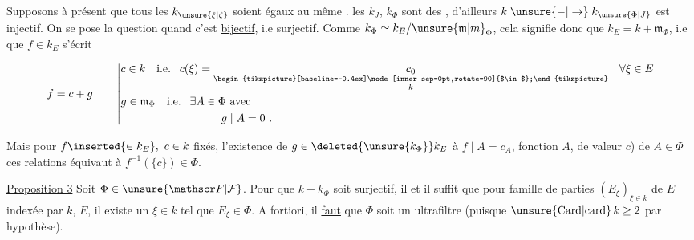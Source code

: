 

Supposons à présent que tous les $k_{\unsure{\xi|\zeta}}$ soient égaux au même .    les $k_J$, $k_\Phi$ sont des , d'ailleurs $k\mathrel{\unsure{-|\to}}k_{\unsure{\Phi|J}}$  est injectif. On se pose la question quand  c'est \uline{bijectif}, i.e surjectif. Comme $k_\Phi\simeq k_E/\unsure{\mathfrak m|m}_\Phi$, cela signifie donc que $k_E=k+\mathfrak m_\Phi$, i.e que  $f\in k_E$ s'écrit

\[
 f=c+g\qquad\left|\begin{aligned}
 &c\in k\quad\text{i.e. }\ c(\xi)=\underset{\substack{\begin{tikzpicture}[baseline=-0.4ex]\node[inner sep=0pt,rotate=90]{$\in$};\end{tikzpicture}\\ k}}{c_0}\quad\forall\xi\in E\\
 &g\in\mathfrak m_\Phi\quad\text{i.e. }\ \exists A\in\Phi\ \text{avec}\\
 &\hspace{9em} g\mid A=0\ .
 \end{aligned}\right.
\]

Mais pour $f\inserted{\in k_E},\ c\in k$  fixés, l'existence de $g\in \deleted{\unsure{k_\Phi}} k_E$     à  $f\mid A=c_A$, \unsure{(}fonction   $A$, de valeur $c$)   de $A\in\Phi$   ces relations équivaut à $f^{-1}(\{c\})\in\Phi$.


\uline{Proposition 3} Soit  $\Phi\in\unsure{\mathscr F|\mathcal F}$. Pour que $k\mathrel{-}k_\Phi$ soit surjectif, il  et il suffit que pour  famille de parties  $(E_\xi)_{\xi\in k}$ de $E$ indexée par $k$,   $E$,  il existe un $\xi\in k$ tel que $E_\xi\in\Phi$. A fortiori, il \uline{faut} que $\Phi$ soit un ultrafiltre (puisque $\unsure{\mathrm{Card}|\mathrm{card}}\,k\geq2$ par hypothèse).

